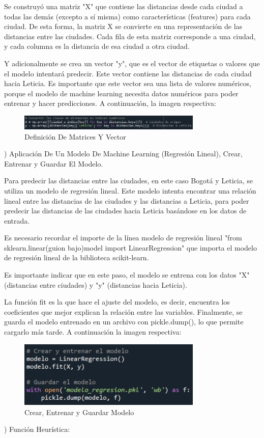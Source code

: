 \documentclass[conference]{IEEEtran}
\begin{document}
\begin{itemize}
	Se construyó una matriz "X" que contiene las distancias desde cada ciudad a todas las demás (excepto a sí misma) como características (features) para cada ciudad. De esta forma, la matriz X se convierte en una representación de las distancias entre las ciudades. Cada fila de esta matriz corresponde a una ciudad, y cada columna es la distancia de esa ciudad a otra ciudad.
	
	Y adicionalmente se crea un vector "y", que es el vector de etiquetas o valores que el modelo intentará predecir. Este vector contiene las distancias de cada ciudad hacia Leticia. Es importante que este vector sea una lista de valores numéricos, porque el modelo de machine learning necesita datos numéricos para poder entrenar y hacer predicciones. A continuación, la imagen respectiva:
		\begin{figure}[ht!] %
			\centering
			\includegraphics[width=3.45in]{Imagen30.png}
			\caption{Definición De Matrices Y Vector}
			\label{picture}
		\end{figure}	
	) Aplicación De Un Modelo De Machine Learning (Regresión Lineal), Crear, Entrenar y Guardar El Modelo.
	
	Para predecir las distancias entre las ciudades, en este caso Bogotá y Leticia, se utiliza un modelo de regresión lineal. Este modelo intenta encontrar una relación lineal entre las distancias de las ciudades y las distancias a Leticia, para poder predecir las distancias de las ciudades hacia Leticia basándose en los datos de entrada. 
	
	Es necesario recordar el importe de la línea modelo de regresión lineal "from sklearn.linear(guion bajo)model import LinearRegression" que importa el modelo de regresión lineal de la biblioteca scikit-learn. 
	
	Es importante indicar que en este paso, el modelo se entrena con los datos "X" (distancias entre ciudades) y "y" (distancias hacia Leticia). 
	
	La función fit es la que hace el ajuste del modelo, es decir, encuentra los coeficientes que mejor explican la relación entre las variables. Finalmente, se guarda el modelo entrenado en un archivo con pickle.dump(), lo que permite cargarlo más tarde. A continuación la imagen respectiva:
		\begin{figure}[ht!] %
			\centering
			\includegraphics[width=3.45in]{Imagen31.png}
			\caption{Crear, Entrenar y Guardar Modelo}
			\label{picture}
		\end{figure}	
	) Función Heurística:
	

\end{itemize}
\end{document}
